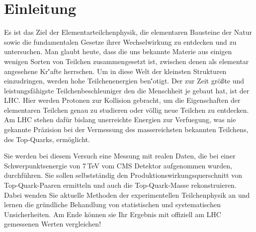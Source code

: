 \section{Einleitung}
\label{intro}
Es ist das Ziel der Elementarteilchenphysik, die elementaren Bausteine der Natur sowie die fundamentalen Gesetze ihrer Wechselwirkung zu entdecken und zu untersuchen. Man glaubt heute, dass die uns bekannte Materie aus einigen wenigen Sorten von Teilchen zusammengesetzt ist, zwischen denen als elementar angesehene Kr\''afte herrschen. Um in diese Welt der kleinsten Strukturen einzudringen, werden hohe Teilchenenergien ben\''otigt. Der zur Zeit gr\"o\ss te und leistungsf\"ahigste Teilchenbeschleuniger den die Menschheit je gebaut hat, ist der LHC. Hier werden Protonen zur Kollision gebracht, um die Eigenschaften der elementaren Teilchen genau zu studieren oder v\"ollig neue Teilchen zu entdecken. Am LHC stehen daf\"ur bislang unerreichte Energien zur Verfuegung, was nie gekannte Pr\"azision bei der Vermessung des massereichsten bekannten Teilchens, des Top-Quarks, erm\"oglicht. 

Sie werden bei diesem Versuch eine Messung mit realen Daten, die bei einer Schwerpunktsenergie von 7\,TeV vom CMS Detektor aufgenommen wurden, durchf\"uhren. Sie sollen selbstst\"andig den Produktionswirkungsquerschnitt von Top-Quark-Paaren ermitteln und auch die Top-Quark-Masse rekonstruieren. Dabei wenden Sie aktuelle Methoden der experimentellen Teilchenphysik an und lernen die gr\"undliche Behandlung von statistischen und systematischen Unsicherheiten. Am Ende k\"onnen sie Ihr Ergebnis mit offiziell am LHC gemessenen Werten vergleichen!

